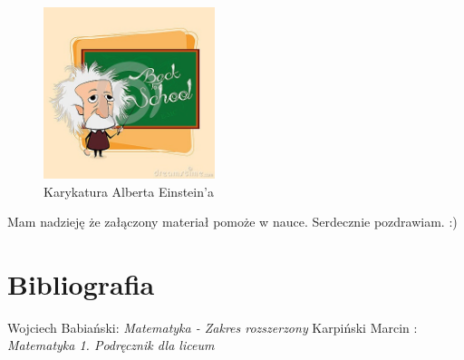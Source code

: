 \documentclass[12pt,a4paper]{article}
\begin{document}
\begin{figure}
\centering
\includegraphics[width=5cm]{einstein}
\caption{Karykatura Alberta Einstein'a}
\label{fig:obrazek troj}
\end{figure}


\center Mam nadzieję że załączony materiał pomoże w nauce.
\center Serdecznie pozdrawiam. :)


\newpage

\section{Bibliografia}

\begin{thebibliography}{9}
Wojciech Babiański: \emph{Matematyka - Zakres rozszerzony}
Karpiński Marcin : \emph{Matematyka 1. Podręcznik dla liceum}

\end{thebibliography}
\end{document}
